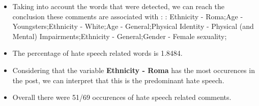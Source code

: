 \documentclass[11pt]{article}
\begin{document}
\begin{itemize}\item Taking into account the words that were detected, we can reach the conclusion these comments are associated with : : Ethnicity - Roma;Age - Youngsters;Ethnicity - White;Age - General;Physical Identity - Physical (and Mental) Impairments;Ethnicity - General;Gender - Female sexuality;%

\item The percentage of hate speech related words is 1.8484.

\item Considering that the variable \textbf{Ethnicity - Roma} has the most occurences in the post, we can interpret that this is the predominant hate speech.

\item Overall there were 51/69 occurences of hate speech related comments.\end{itemize}
\end{document}
